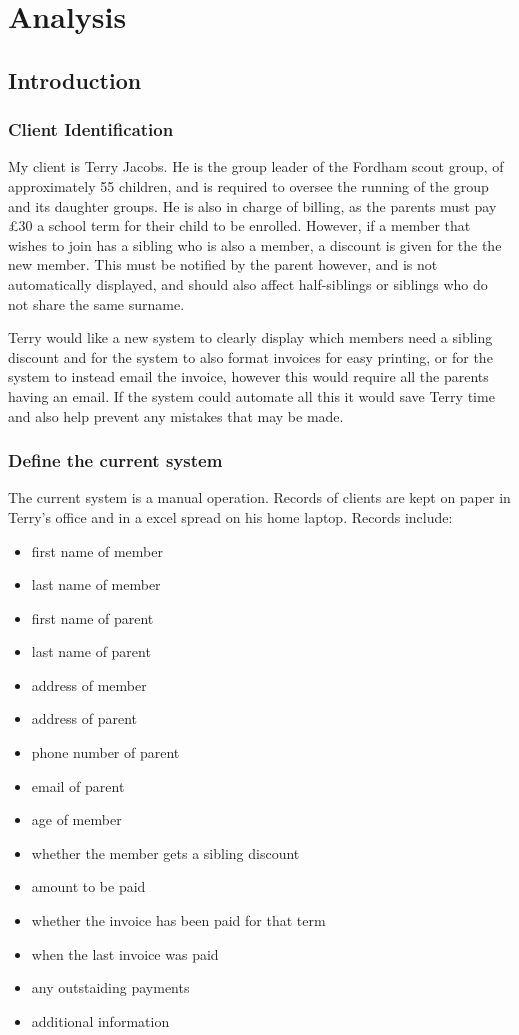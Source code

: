 \chapter{Analysis}

\section{Introduction}

\subsection{Client Identification}
My client is Terry Jacobs. He is the group leader of the Fordham scout group, of approximately 55 children, and is required to oversee the running of the group and its daughter groups. He is also in charge of billing, as the parents must pay  \pounds 30 a school term for their child to be enrolled. However, if a member that wishes to join has a sibling who is also a member, a discount is given for the the new member. This must be notified by the parent however, and is not automatically displayed, and should also affect half-siblings or siblings who do not share the same surname.

Terry would like a new system to clearly display which members need a sibling discount and for the system to also format invoices for easy printing, or for the system to instead email the invoice, however this would require all the parents having an email. If the system could automate all this it would save Terry time and also help prevent any mistakes that may be made.

\subsection{Define the current system}
The current system is a manual operation. Records of clients are kept on paper in Terry's office and in a excel spread on his home laptop. Records include:
\begin{itemize}
   \item first name of member
   \item last name of member
   \item first name of parent
   \item last name of parent
	\item address of member
	\item address of parent
	\item phone number of parent
	\item email of parent
	\item age of member
	\item whether the member gets a sibling discount
	\item amount to be paid
	\item whether the invoice has been paid for that term
	\item when the last invoice was paid
	\item any outstaiding payments
	\item additional information
\end{itemize}

